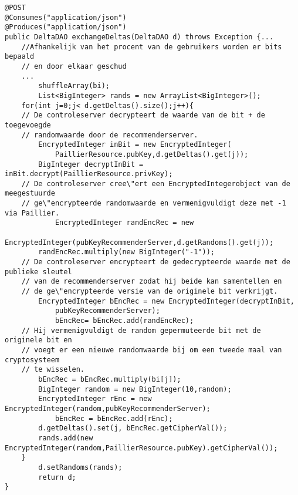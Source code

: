 \begin{verbatim}
@POST
@Consumes("application/json")
@Produces("application/json")
public DeltaDAO exchangeDeltas(DeltaDAO d) throws Exception {...
    //Afhankelijk van het procent van de gebruikers worden er bits bepaald 
    // en door elkaar geschud
	...
    	shuffleArray(bi);
    	List<BigInteger> rands = new ArrayList<BigInteger>();
    for(int j=0;j< d.getDeltas().size();j++){
    // De controleserver decrypteert de waarde van de bit + de toegevoegde 
    // randomwaarde door de recommenderserver.
       	EncryptedInteger inBit = new EncryptedInteger(
       		PaillierResource.pubKey,d.getDeltas().get(j));
       	BigInteger decryptInBit =  inBit.decrypt(PaillierResource.privKey);
    // De controleserver cree\"ert een EncryptedIntegerobject van de meegestuurde 
    // ge\"encrypteerde randomwaarde en vermenigvuldigt deze met -1 via Paillier.
    		EncryptedInteger randEncRec = new 
        		EncryptedInteger(pubKeyRecommenderServer,d.getRandoms().get(j));
      	randEncRec.multiply(new BigInteger("-1"));
    // De controleserver encrypteert de gedecrypteerde waarde met de publieke sleutel
    // van de recommenderserver zodat hij beide kan samentellen en 
    // de ge\"encrypteerde versie van de originele bit verkrijgt.
      	EncryptedInteger bEncRec = new EncryptedInteger(decryptInBit,
      		pubKeyRecommenderServer);
        	bEncRec= bEncRec.add(randEncRec);
    // Hij vermenigvuldigt de random gepermuteerde bit met de originele bit en 
    // voegt er een nieuwe randomwaarde bij om een tweede maal van cryptosysteem 
    // te wisselen.
       	bEncRec = bEncRec.multiply(bi[j]);
        BigInteger random = new BigInteger(10,random);
       	EncryptedInteger rEnc = new EncryptedInteger(random,pubKeyRecommenderServer);
        	bEncRec = bEncRec.add(rEnc);
       	d.getDeltas().set(j, bEncRec.getCipherVal());
       	rands.add(new EncryptedInteger(random,PaillierResource.pubKey).getCipherVal());        
   	}
    	d.setRandoms(rands);
    	return d;        
}
\end{verbatim}